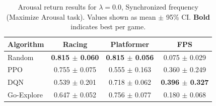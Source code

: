 \begin{table}[ht]
\centering
\caption{Arousal return results for $\lambda=0.0$, Synchronized frequency (Maximize Arousal task). Values shown as mean $\pm$ 95\% CI. \textbf{Bold} indicates best per game.}
\label{tab:results_lambda0_sync}
\begin{tabular}{lccc}
\toprule
Algorithm & Racing & Platformer & FPS \\
\midrule
Random & \textbf{0.815 $\pm$ 0.060} & \textbf{0.815 $\pm$ 0.056} & 0.075 $\pm$ 0.029 \\
PPO & 0.755 $\pm$ 0.075 & 0.555 $\pm$ 0.163 & 0.360 $\pm$ 0.249 \\
DQN & 0.539 $\pm$ 0.201 & 0.718 $\pm$ 0.062 & \textbf{0.396 $\pm$ 0.327} \\
Go-Explore & 0.647 $\pm$ 0.052 & 0.756 $\pm$ 0.077 & 0.180 $\pm$ 0.068 \\
\bottomrule
\end{tabular}
\end{table}
